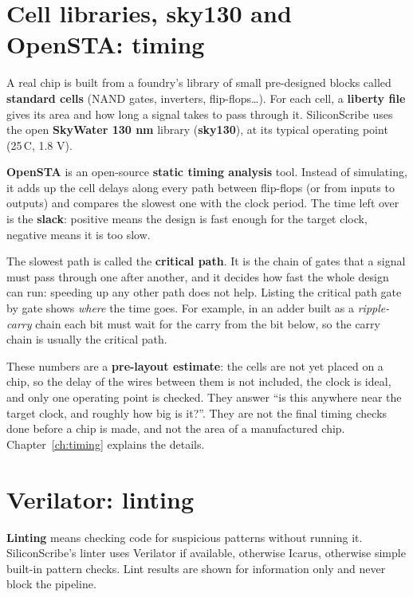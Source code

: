 \section{Cell libraries, sky130 and OpenSTA: timing}

A real chip is built from a foundry's library of small pre-designed blocks called \textbf{standard cells} (NAND gates, inverters, flip-flops\ldots). For each cell, a \textbf{liberty file} gives its area and how long a signal takes to pass through it. SiliconScribe uses the open \textbf{SkyWater 130 nm} library (\textbf{sky130}), at its typical operating point (25\,\textdegree C, 1.8 V).

\textbf{OpenSTA} is an open-source \textbf{static timing analysis} tool. Instead of simulating, it adds up the cell delays along every path between flip-flops (or from inputs to outputs) and compares the slowest one with the clock period. The time left over is the \textbf{slack}: positive means the design is fast enough for the target clock, negative means it is too slow.

The slowest path is called the \textbf{critical path}. It is the chain of gates that a signal must pass through one after another, and it decides how fast the whole design can run: speeding up any other path does not help. Listing the critical path gate by gate shows \emph{where} the time goes. For example, in an adder built as a \emph{ripple-carry} chain each bit must wait for the carry from the bit below, so the carry chain is usually the critical path.

\begin{warnbox}
These numbers are a \textbf{pre-layout estimate}: the cells are not yet placed on a chip, so the delay of the wires between them is not included, the clock is ideal, and only one operating point is checked. They answer ``is this anywhere near the target clock, and roughly how big is it?''. They are not the final timing checks done before a chip is made, and not the area of a manufactured chip. Chapter~\ref{ch:timing} explains the details.
\end{warnbox}

\section{Verilator: linting}

\textbf{Linting} means checking code for suspicious patterns without running it. SiliconScribe's linter uses Verilator if available, otherwise Icarus, otherwise simple built-in pattern checks. Lint results are shown for information only and never block the pipeline.

